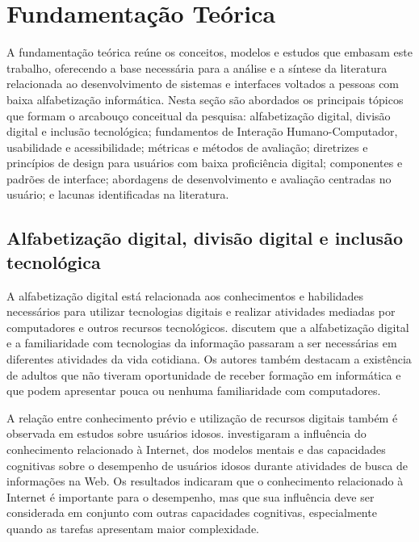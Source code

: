 \chapter{Fundamentação Teórica}

\label{sec:fundamentacao}

A fundamentação teórica reúne os conceitos, modelos e estudos que embasam este trabalho, oferecendo a base necessária para a análise e a síntese da literatura relacionada ao desenvolvimento de sistemas e interfaces voltados a pessoas com baixa alfabetização informática. Nesta seção são abordados os principais tópicos que formam o arcabouço conceitual da pesquisa: alfabetização digital, divisão digital e inclusão tecnológica; fundamentos de Interação Humano-Computador, usabilidade e acessibilidade; métricas e métodos de avaliação; diretrizes e princípios de design para usuários com baixa proficiência digital; componentes e padrões de interface; abordagens de desenvolvimento e avaliação centradas no usuário; e lacunas identificadas na literatura.

\section{Alfabetização digital, divisão digital e inclusão tecnológica}

\label{sec:alfabetizacao}

A alfabetização digital está relacionada aos conhecimentos e habilidades necessários para utilizar tecnologias digitais e realizar atividades mediadas por computadores e outros recursos tecnológicos. \cite{kabassi2004personalised} discutem que a alfabetização digital e a familiaridade com tecnologias da informação passaram a ser necessárias em diferentes atividades da vida cotidiana. Os autores também destacam a existência de adultos que não tiveram oportunidade de receber formação em informática e que podem apresentar pouca ou nenhuma familiaridade com computadores.

A relação entre conhecimento prévio e utilização de recursos digitais também é observada em estudos sobre usuários idosos. \cite{sharit2008information} investigaram a influência do conhecimento relacionado à Internet, dos modelos mentais e das capacidades cognitivas sobre o desempenho de usuários idosos durante atividades de busca de informações na Web. Os resultados indicaram que o conhecimento relacionado à Internet é importante para o desempenho, mas que sua influência deve ser considerada em conjunto com outras capacidades cognitivas, especialmente quando as tarefas apresentam maior complexidade.

